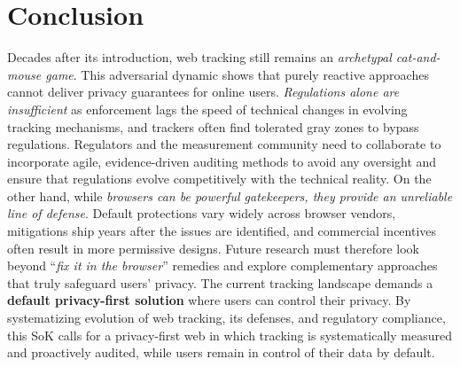 \section{Conclusion}

Decades after its introduction, web tracking still remains an \textit{archetypal cat-and-mouse game}.
%
%
This adversarial dynamic shows that purely reactive approaches cannot deliver privacy guarantees for online users.
%
\textit{Regulations alone are insufficient} as enforcement lags the speed of technical changes in evolving tracking mechanisms, and trackers often find tolerated gray zones to bypass regulations.
% 
Regulators and the measurement community need to collaborate to incorporate agile, evidence-driven auditing methods to avoid any oversight and ensure that regulations evolve competitively with the technical reality.
%
On the other hand, while \textit{browsers can be powerful gatekeepers, they provide an unreliable line of defense}.
%
Default protections vary widely across browser vendors, mitigations ship years after the issues are identified, and commercial incentives often result in more permissive designs.
%
Future research must therefore look beyond ``\textit{fix it in the browser}'' remedies and explore complementary approaches that truly safeguard users' privacy.
%
The current tracking landscape demands a \textbf{default privacy-first solution} where users can control their privacy.
%
By systematizing evolution of web tracking, its defenses, and regulatory compliance, this SoK calls for a privacy-first web in which tracking is systematically measured and proactively audited, while users remain in control of their data by default.
